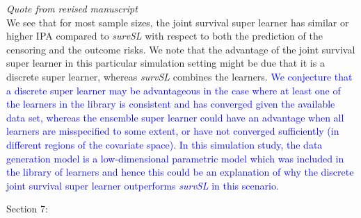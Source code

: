 \documentclass[a4paper,danish]{article}
\newcommand{\1}{\mathds{1}}
\newcommand{\qrev}[2]{
\vspace{.5em}
\begin{tcolorbox}[boxrule=0pt]
\hfill{\it\footnotesize Quote from revised manuscript#1}\\[.5em]
#2
\end{tcolorbox}
}
\begin{document}
\begin{itemize}
  \qrev{}{
  We see
that for most sample sizes, the joint survival super learner has
similar or higher IPA compared to {\it survSL} with respect to both
the prediction of the censoring and the outcome risks. We note that
the advantage of the joint survival super learner in this particular
simulation setting might be due that it is a discrete super learner,
whereas {\it survSL} combines the learners. \textcolor{blue}{We conjecture that a
discrete super learner may be advantageous in the case where at least
one of the learners in the library is consistent and has converged
given the available data set, whereas the ensemble super learner could
have an advantage when all learners are misspecified to some extent,
or have not converged sufficiently (in different regions of the
covariate space). In this simulation study, the data generation model
is a low-dimensional parametric model which was included in the
library of learners and hence this could be an explanation of why the
discrete joint survival super learner outperforms {\it survSL} in this
scenario.
  }
  }
\end{itemize}

Section 7:
\end{document}
